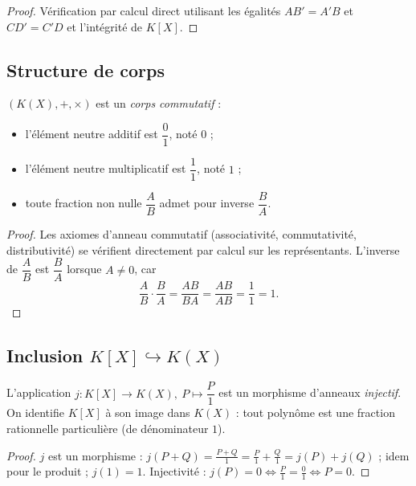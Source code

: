 \begin{proof}
Vérification par calcul direct utilisant les égalités $AB' = A'B$ et $CD' = C'D$ et l'intégrité de $K[X]$.
\end{proof}

\subsection{Structure de corps}

\begin{theoreme}
$(K(X), +, \times)$ est un \emph{corps commutatif} :
\begin{itemize}
    \item l'élément neutre additif est $\dfrac{0}{1}$, noté $0$ ;
    \item l'élément neutre multiplicatif est $\dfrac{1}{1}$, noté $1$ ;
    \item toute fraction non nulle $\dfrac{A}{B}$ admet pour inverse $\dfrac{B}{A}$.
\end{itemize}
\end{theoreme}

\begin{proof}
Les axiomes d'anneau commutatif (associativité, commutativité, distributivité) se vérifient directement par calcul sur les représentants. L'inverse de $\dfrac{A}{B}$ est $\dfrac{B}{A}$ lorsque $A \neq 0$, car
\[ \frac{A}{B} \cdot \frac{B}{A} = \frac{AB}{BA} = \frac{AB}{AB} = \frac{1}{1} = 1. \]
\end{proof}

\subsection{Inclusion $K[X] \hookrightarrow K(X)$}

\begin{proposition}
L'application $j : K[X] \to K(X),\ P \mapsto \dfrac{P}{1}$ est un morphisme d'anneaux \emph{injectif}. On identifie $K[X]$ à son image dans $K(X)$ : tout polynôme est une fraction rationnelle particulière (de dénominateur $1$).
\end{proposition}

\begin{proof}
$j$ est un morphisme : $j(P + Q) = \frac{P + Q}{1} = \frac{P}{1} + \frac{Q}{1} = j(P) + j(Q)$ ; idem pour le produit ; $j(1) = 1$.
Injectivité : $j(P) = 0 \iff \frac{P}{1} = \frac{0}{1} \iff P = 0$.
\end{proof}

